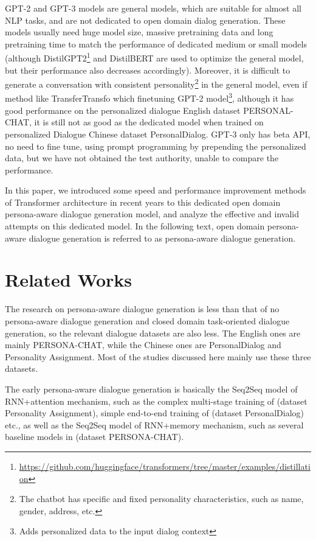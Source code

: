 \documentclass[letterpaper]{article} %
\DeclareRobustCommand{\citeext}[1]{\cite[#1]{#1}}
\begin{document}
GPT-2 and GPT-3 models are general models, which are suitable for almost all NLP tasks, and are not dedicated to open domain dialog generation. These models usually need huge model size, massive pretraining data and long pretraining time to match the performance of dedicated medium or small models (although DistilGPT2\footnote{\url{https://github.com/huggingface/transformers/tree/master/examples/distillation}} and DistilBERT\citeext{Sanh2019} are used to optimize the general model, but their performance also decreases accordingly). 
Moreover, it is difficult to generate a conversation with consistent personality\footnote{The chatbot has specific and fixed personality characteristics, such as name, gender, address, etc.} in the general model, even if method like TransferTransfo\citeext{Wolf2019} which finetuning GPT-2 model\footnote{Adds personalized data to the input dialog context}, although it has good performance on the personalized dialogue English dataset PERSONAL-CHAT\citeext{Zhang2018}, it is still not as good as the dedicated model\citeext{Zheng2019} when trained on personalized Dialogue Chinese dataset PersonalDialog\citeext{Zheng2019a}. GPT-3 only has beta API, no need to fine tune, using prompt programming by prepending the personalized data, but we have not obtained the test authority, unable to compare the performance. 

In this paper, we introduced some speed and performance improvement methods of Transformer architecture in recent years to this dedicated open domain persona-aware dialogue generation model\citeext{Zheng2019}, and analyze the effective and invalid attempts on this dedicated model. In the following text, open domain persona-aware dialogue generation is referred to as persona-aware dialogue generation. 

\section[Related Works]{Related Works} 
The research on persona-aware dialogue generation is less than that of no persona-aware dialogue generation and closed domain task-oriented dialogue generation, so the relevant dialogue datasets are also less. The English ones are mainly PERSONA-CHAT\citeext{Zhang2018}, while the Chinese ones are PersonalDialog\citeext{Zheng2019a} and Personality Assignment\citeext{Qian2017}. Most of the studies discussed here mainly use these three datasets. 

The early persona-aware dialogue generation is basically the Seq2Seq model\citeext{SutskeverGoogle2014} of RNN+attention mechanism\citeext{Bahdanau2015}, such as the complex multi-stage training of\citeext{Qian2017} (dataset Personality Assignment), simple end-to-end training of\citeext{Zheng2019a} (dataset PersonalDialog) etc., as well as the Seq2Seq model of RNN+memory mechanism\citeext{Sukhbaatar2015}, such as several baseline models in\citeext{Zhang2018} (dataset PERSONA-CHAT). 
\end{document}
